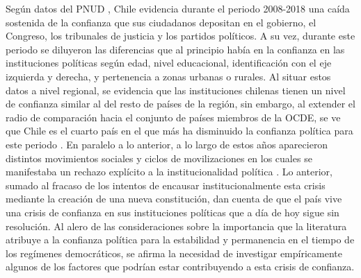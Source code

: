 \documentclass[12pt,twoside]{templates/facsothesis}
\begin{document}
Según datos del PNUD \citeyearpar{pnudDiezAnosAuditoria2019}, Chile evidencia durante el periodo 2008-2018 una caída sostenida de la confianza que sus ciudadanos depositan en el gobierno, el Congreso, los tribunales de justicia y los partidos políticos. A su vez, durante este periodo se diluyeron las diferencias que al principio había en la confianza en las instituciones políticas según edad, nivel educacional, identificación con el eje izquierda y derecha, y pertenencia a zonas urbanas o rurales. Al situar estos datos a nivel regional, se evidencia que las instituciones chilenas tienen un nivel de confianza similar al del resto de países de la región, sin embargo, al extender el radio de comparación hacia el conjunto de países miembros de la OCDE, se ve que Chile es el cuarto país en el que más ha disminuido la confianza política para este periodo \citep{pnudDiezAnosAuditoria2019}. En paralelo a lo anterior, a lo largo de estos años aparecieron distintos movimientos sociales y ciclos de movilizaciones en los cuales se manifestaba un rechazo explícito a la institucionalidad política \citep{avendanoPropuestasCambioDebilidad2021, barozetEntreUrnaRedes2016}. Lo anterior, sumado al fracaso de los intentos de encausar institucionalmente esta crisis mediante la creación de una nueva constitución, dan cuenta de que el país vive una crisis de confianza en sus instituciones políticas que a día de hoy sigue sin resolución. Al alero de las consideraciones sobre la importancia que la literatura atribuye a la confianza política para la estabilidad y permanencia en el tiempo de los regímenes democráticos, se afirma la necesidad de investigar empíricamente algunos de los factores que podrían estar contribuyendo a esta crisis de confianza.
\end{document}
